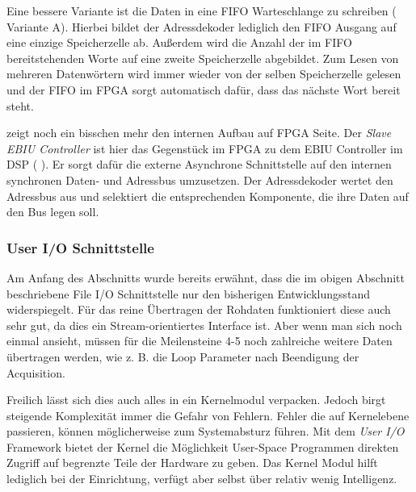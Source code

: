 Eine bessere Variante ist die Daten in eine \gls{FIFO} Warteschlange zu schreiben ( Variante A). Hierbei bildet der Adressdekoder lediglich den FIFO Ausgang auf eine einzige Speicherzelle ab. Außerdem wird die Anzahl der im FIFO bereitstehenden Worte auf eine zweite Speicherzelle abgebildet. Zum Lesen von mehreren Datenwörtern wird immer wieder von der selben Speicherzelle gelesen und der FIFO im FPGA sorgt automatisch dafür, dass das nächste Wort bereit steht.

 zeigt noch ein bisschen mehr den internen Aufbau auf FPGA Seite. Der \emph{Slave EBIU Controller} ist hier das Gegenstück im FPGA zu dem EBIU Controller im DSP ( ). Er sorgt dafür die externe Asynchrone Schnittstelle auf den internen synchronen Daten- und Adressbus umzusetzen. Der Adressdekoder wertet den Adressbus aus und selektiert die entsprechenden Komponente, die ihre Daten auf den Bus legen soll.




\subsubsection{User I/O Schnittstelle}
Am Anfang des Abschnitts wurde bereits erwähnt, dass die im obigen Abschnitt beschriebene File I/O Schnittstelle nur den bisherigen Entwicklungsstand widerspiegelt. Für das reine Übertragen der Rohdaten funktioniert diese auch sehr gut, da dies ein Stream-orientiertes Interface ist. Aber wenn man sich noch einmal  ansieht, müssen für die Meilensteine 4-5 noch zahlreiche weitere Daten übertragen werden, wie z. B. die Loop Parameter nach Beendigung der Acquisition.

Freilich lässt sich dies auch alles in ein Kernelmodul verpacken. Jedoch birgt steigende Komplexität immer die Gefahr von Fehlern. Fehler die auf Kernelebene passieren, können möglicherweise zum Systemabsturz führen. Mit dem \emph{User I/O} Framework bietet der Kernel die Möglichkeit User-Space Programmen direkten Zugriff auf begrenzte Teile der Hardware zu geben. Das Kernel Modul hilft lediglich bei der Einrichtung, verfügt aber selbst über relativ wenig Intelligenz. 

